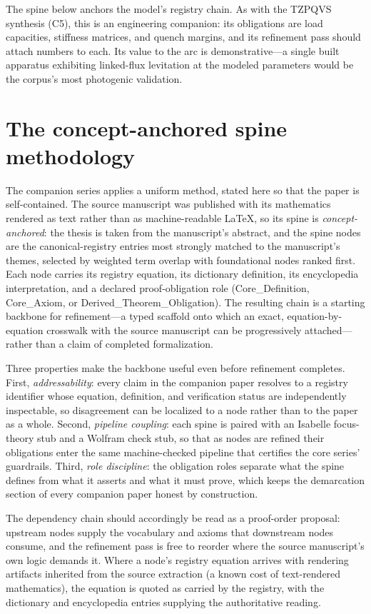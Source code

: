 \documentclass[11pt]{article}
\theoremstyle{remark}
\begin{document}
The spine below anchors the model's registry chain. As with the TZPQVS synthesis (C5), this is an engineering companion: its obligations are load capacities, stiffness matrices, and quench margins, and its refinement pass should attach numbers to each. Its value to the arc is demonstrative---a single built apparatus exhibiting linked-flux levitation at the modeled parameters would be the corpus's most photogenic validation.

\section{The concept-anchored spine methodology}
\label{sec:method}

The companion series applies a uniform method, stated here so that the paper is self-contained. The source manuscript was published with its mathematics rendered as text rather than as machine-readable LaTeX, so its spine is \emph{concept-anchored}: the thesis is taken from the manuscript's abstract, and the spine nodes are the canonical-registry entries most strongly matched to the manuscript's themes, selected by weighted term overlap with foundational nodes ranked first. Each node carries its registry equation, its dictionary definition, its encyclopedia interpretation, and a declared proof-obligation role (Core\_Definition, Core\_Axiom, or Derived\_Theorem\_Obligation). The resulting chain is a starting backbone for refinement---a typed scaffold onto which an exact, equation-by-equation crosswalk with the source manuscript can be progressively attached---rather than a claim of completed formalization.

Three properties make the backbone useful even before refinement completes. First, \emph{addressability}: every claim in the companion paper resolves to a registry identifier whose equation, definition, and verification status are independently inspectable, so disagreement can be localized to a node rather than to the paper as a whole. Second, \emph{pipeline coupling}: each spine is paired with an Isabelle focus-theory stub and a Wolfram check stub, so that as nodes are refined their obligations enter the same machine-checked pipeline that certifies the core series' guardrails. Third, \emph{role discipline}: the obligation roles separate what the spine defines from what it asserts and what it must prove, which keeps the demarcation section of every companion paper honest by construction.

The dependency chain should accordingly be read as a proof-order proposal: upstream nodes supply the vocabulary and axioms that downstream nodes consume, and the refinement pass is free to reorder where the source manuscript's own logic demands it. Where a node's registry equation arrives with rendering artifacts inherited from the source extraction (a known cost of text-rendered mathematics), the equation is quoted as carried by the registry, with the dictionary and encyclopedia entries supplying the authoritative reading.
\end{document}
